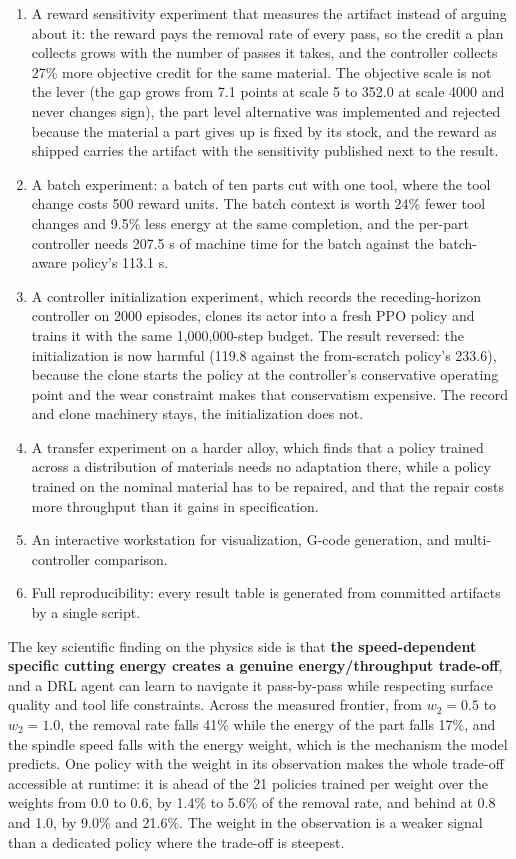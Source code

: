 \documentclass[11pt,a4paper]{article}
\begin{document}
\begin{enumerate}
    \item A reward sensitivity experiment that measures the artifact instead of arguing about it: the reward pays the removal rate of every pass, so the credit a plan collects grows with the number of passes it takes, and the controller collects 27\% more objective credit for the same material. The objective scale is not the lever (the gap grows from 7.1 points at scale 5 to 352.0 at scale 4000 and never changes sign), the part level alternative was implemented and rejected because the material a part gives up is fixed by its stock, and the reward as shipped carries the artifact with the sensitivity published next to the result.
    \item A batch experiment: a batch of ten parts cut with one tool, where the tool change costs 500 reward units. The batch context is worth 24\% fewer tool changes and 9.5\% less energy at the same completion, and the per-part controller needs 207.5 s of machine time for the batch against the batch-aware policy's 113.1 s.
    \item A controller initialization experiment, which records the receding-horizon controller on 2000 episodes, clones its actor into a fresh PPO policy and trains it with the same 1,000,000-step budget. The result reversed: the initialization is now harmful (119.8 against the from-scratch policy's 233.6), because the clone starts the policy at the controller's conservative operating point and the wear constraint makes that conservatism expensive. The record and clone machinery stays, the initialization does not.
    \item A transfer experiment on a harder alloy, which finds that a policy trained across a distribution of materials needs no adaptation there, while a policy trained on the nominal material has to be repaired, and that the repair costs more throughput than it gains in specification.
    \item An interactive workstation for visualization, G-code generation, and multi-controller comparison.
    \item Full reproducibility: every result table is generated from committed artifacts by a single script.
\end{enumerate}

The key scientific finding on the physics side is that \textbf{the speed-dependent specific cutting energy creates a genuine energy/throughput trade-off}, and a DRL agent can learn to navigate it pass-by-pass while respecting surface quality and tool life constraints. Across the measured frontier, from $w_2 = 0.5$ to $w_2 = 1.0$, the removal rate falls 41\% while the energy of the part falls 17\%, and the spindle speed falls with the energy weight, which is the mechanism the model predicts. One policy with the weight in its observation makes the whole trade-off accessible at runtime: it is ahead of the 21 policies trained per weight over the weights from 0.0 to 0.6, by 1.4\% to 5.6\% of the removal rate, and behind at 0.8 and 1.0, by 9.0\% and 21.6\%. The weight in the observation is a weaker signal than a dedicated policy where the trade-off is steepest.
\end{document}
